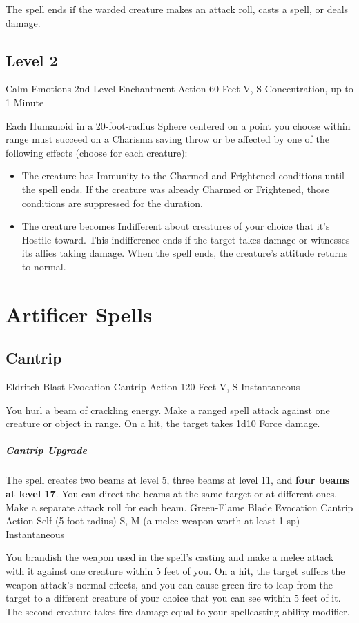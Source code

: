 \documentclass[letterpaper,openany,oneside,twocolumn]{book}
\begin{document}
The spell ends if the warded creature makes an attack roll, casts a spell, or deals damage.

\subsection*{Level 2}
\DndSpellHeader
  {Calm Emotions}
  {2nd-Level Enchantment}
  {Action}
  {60 Feet}
  {V, S}
  {Concentration, up to 1 Minute}

Each Humanoid in a 20-foot-radius Sphere centered on a point you choose within range must succeed on a Charisma saving throw or be affected by one of the following effects (choose for each creature):
\begin{itemize}
	\item The creature has Immunity to the Charmed and Frightened conditions until the spell ends. If the creature was already Charmed or Frightened, those conditions are suppressed for the duration.
	\item The creature becomes Indifferent about creatures of your choice that it's Hostile toward. This indifference ends if the target takes damage or witnesses its allies taking damage. When the spell ends, the creature's attitude returns to normal.
\end{itemize}
\vfill\eject
\section*{Artificer Spells}
\subsection*{Cantrip}
\DndSpellHeader
  {Eldritch Blast}
  {Evocation Cantrip}
  {Action}
  {120 Feet}
  {V, S}
  {Instantaneous}

You hurl a beam of crackling energy. Make a ranged spell attack against one creature or object in range. On a hit, the target takes 1d10 Force damage.

\subparagraph*{Cantrip Upgrade} The spell creates two beams at level 5, three beams at level 11, and \textbf{four beams at level 17}. You can direct the beams at the same target or at different ones. Make a separate attack roll for each beam.
\DndSpellHeader
  {Green-Flame Blade}
  {Evocation Cantrip}
  {Action}
  {Self (5-foot radius)}
  {S, M (a melee weapon worth at least 1 sp)}
  {Instantaneous}

You brandish the weapon used in the spell's casting and make a melee attack with it against one creature within 5 feet of you. On a hit, the target suffers the weapon attack's normal effects, and you can cause green fire to leap from the target to a different creature of your choice that you can see within 5 feet of it. The second creature takes fire damage equal to your spellcasting ability modifier.
\end{document}
